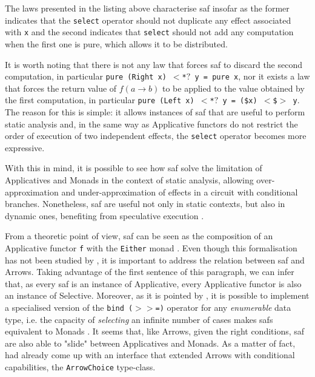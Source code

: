 \documentclass[
  oneside,
  11pt, a4paper,
  footinclude=true,
  headinclude=true,
  cleardoublepage=empty
]{scrbook}
\theoremstyle{definition}
\theoremstyle{definition}
\begin{document}
	The laws presented in the listing above characterise \gls{saf} insofar as the former indicates that the \texttt{select} operator should not duplicate any effect associated with \texttt{x} and the second indicates that \texttt{select} should not add any computation when the first one is pure, which allows it to be distributed.
	            
	It is worth noting that there is not any law that forces \gls{saf} to discard the second computation, in particular \texttt{pure (Right x) $<$*$?$ y = pure x}, nor it exists a law that forces the return value of $f (a \rightarrow b)$ to be applied to the value obtained by the first computation, in particular \texttt{pure (Left x) $<$*$?$ y = (\$x) $<$\$$>$ y}. The reason for this is simple: it allows instances of \gls{saf} that are useful to perform static analysis and, in the same way as Applicative functors do not restrict the order of execution of two independent effects, the \texttt{select} operator becomes more expressive.
	            
	With this in mind, it is possible to see how \gls{saf} solve the limitation of Applicatives and Monads in the context of static analysis, allowing over-approximation and under-approximation of effects in a circuit with conditional branches. Nonetheless, \gls{saf} are useful not only in static contexts, but also in dynamic ones, benefiting from speculative execution \citep{andrey2019selective}.
	            
	From a theoretic point of view, \gls{saf} can be seen as the composition of an Applicative functor \texttt{f} with the \texttt{Either} monad \citep{andrey2019selective}. Even though this formalisation has not been studied by \cite{andrey2019selective}, it is important to address the relation between \gls{saf} and Arrows. Taking advantage of the first sentence of this paragraph, we can infer that, as every \gls{saf} is an instance of Applicative, every Applicative functor is also an instance of Selective. Moreover, as it is pointed by \cite{andrey2019selective}, it is possible to implement a specialised version of the \texttt{bind ($>>$=)} operator for any \emph{enumerable} data type, i.e. the capacity of \emph{selecting} an infinite number of cases makes \glspl{saf} equivalent to Monads \citep{gist_2019}. It seems that, like Arrows, given the right conditions, \gls{saf} are also able to "slide" between Applicatives and Monads. As a matter of fact, \cite{Hughes:2000:GMA:347238.347246} had already come up with an interface that extended Arrows with conditional capabilities, the \texttt{ArrowChoice} type-class.
	            
\end{document}
